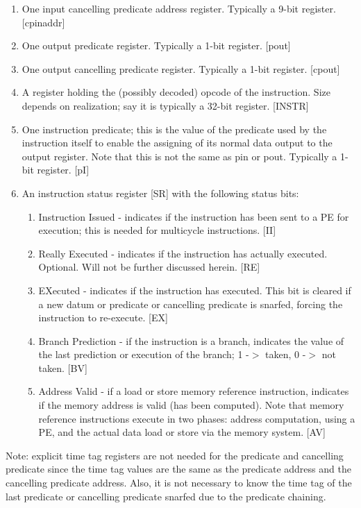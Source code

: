 \documentclass[10pt,dvips]{article}
\begin{document}
\begin{enumerate}
\item One input cancelling predicate address register. Typically a 9-bit register.
[cpinaddr]
\item One output predicate register. Typically a 1-bit register. [pout]
\item One output cancelling predicate register. Typically a 1-bit register. [cpout]
\item A register holding the (possibly decoded) opcode of the instruction.
Size depends on realization; say it is typically a 32-bit register. [INSTR]
\item One instruction predicate; this is the value of the
predicate used by the instruction itself to enable the assigning of its normal
data output
to the output register. Note that this is not the same as pin or pout. Typically
a 1-bit register. [pI]
\item An instruction status register [SR] with the following status bits:
\begin{enumerate}
\item Instruction
Issued - indicates if the instruction has been sent to a PE for execution; this
is needed for multicycle instructions. [II]
\item Really Executed - indicates if the instruction has actually executed.
Optional. Will not be further discussed herein. [RE]
\item EXecuted - indicates if the instruction has executed. This bit is cleared if
a new datum or predicate or cancelling predicate is snarfed, forcing the instruction
to re-execute. [EX]
\item Branch Prediction - if the instruction is a branch, indicates the value of the
last prediction or execution of the branch; 1 -$>$ taken, 0 -$>$ not taken. [BV]
\item Address Valid - if a load or store memory reference instruction, indicates if the
memory address is valid (has been computed). Note that memory reference instructions
execute in two phases: address computation, using a PE, and the actual data load or
store via the memory system. [AV]

\end{enumerate}

\end{enumerate}

Note: explicit time tag registers are not needed for the predicate and cancelling
predicate since the time tag values are the same as the predicate address and
the cancelling predicate address. Also, it is not necessary to know the time tag
of the last predicate or cancelling predicate snarfed due to the predicate
chaining.
\end{document}
